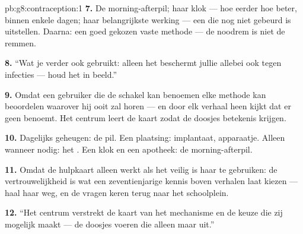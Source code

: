 \begin{solution}{pb:g8:contraception:1}
\textbf{7.} De morning-afterpil; haar klok --- hoe eerder hoe beter,
binnen enkele dagen; haar belangrijkste werking --- een  die nog
niet gebeurd is uitstellen. Daarna: een goed gekozen vaste methode --- de
noodrem is niet de remmen.

\textbf{8.} ``Wat je verder ook gebruikt: alleen het  beschermt
jullie allebei ook tegen infecties --- houd het in beeld.''

\textbf{9.} Omdat een gebruiker die de schakel kan benoemen elke methode
kan beoordelen waarover hij ooit zal horen --- en door elk verhaal heen
kijkt dat er geen benoemt. Het centrum leert de kaart zodat de doosjes
betekenis krijgen.

\textbf{10.} Dagelijks geheugen: de pil. Een plaatsing: implantaat,
apparaatje. Alleen wanneer nodig: het . Een klok en een apotheek:
de morning-afterpil.

\textbf{11.} Omdat de hulpkaart alleen werkt als het veilig is haar te
gebruiken: de vertrouwelijkheid is wat een zeventienjarige kennis boven
verhalen laat kiezen --- haal haar weg, en de vragen keren terug naar het
schoolplein.

\textbf{12.} ``Het centrum verstrekt de kaart van het mechanisme en de
keuze die zij mogelijk maakt --- de doosjes voeren die alleen maar uit.''
\end{solution}
